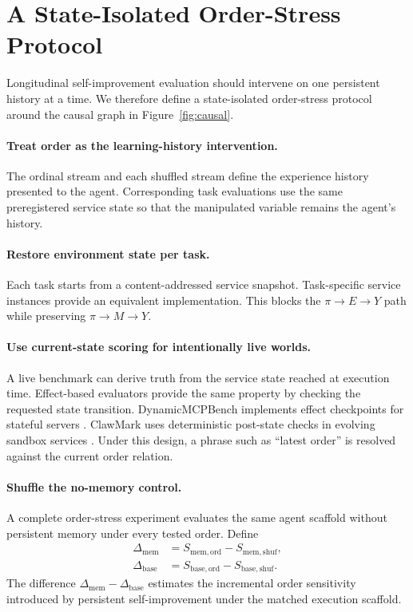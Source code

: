 \section{A State-Isolated Order-Stress Protocol}
\label{sec:protocol}
Longitudinal self-improvement evaluation should intervene on one persistent history at a time. We therefore define a state-isolated order-stress protocol around the causal graph in Figure~\ref{fig:causal}.

\paragraph{Treat order as the learning-history intervention.} The ordinal stream and each shuffled stream define the experience history presented to the agent. Corresponding task evaluations use the same preregistered service state so that the manipulated variable remains the agent's history.

\paragraph{Restore environment state per task.} Each task starts from a content-addressed service snapshot. Task-specific service instances provide an equivalent implementation. This blocks the $\pi\rightarrow E\rightarrow Y$ path while preserving $\pi\rightarrow M\rightarrow Y$.

\paragraph{Use current-state scoring for intentionally live worlds.} A live benchmark can derive truth from the service state reached at execution time. Effect-based evaluators provide the same property by checking the requested state transition. DynamicMCPBench implements effect checkpoints for stateful servers \citep{kaminski2026dynamicmcpbench}. ClawMark uses deterministic post-state checks in evolving sandbox services \citep{meng2026clawmark}. Under this design, a phrase such as ``latest order'' is resolved against the current order relation.

\paragraph{Shuffle the no-memory control.} A complete order-stress experiment evaluates the same agent scaffold without persistent memory under every tested order. Define
\begin{align}
\Delta_{\mathrm{mem}} &= S_{\mathrm{mem,ord}}-S_{\mathrm{mem,shuf}},\\
\Delta_{\mathrm{base}} &= S_{\mathrm{base,ord}}-S_{\mathrm{base,shuf}}.
\end{align}
The difference $\Delta_{\mathrm{mem}}-\Delta_{\mathrm{base}}$ estimates the incremental order sensitivity introduced by persistent self-improvement under the matched execution scaffold.

